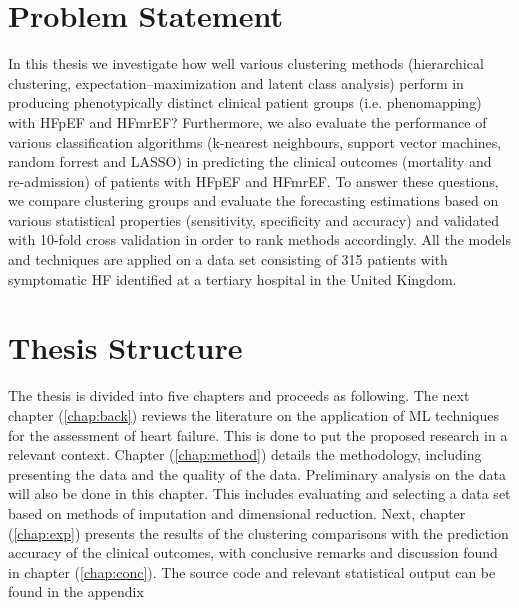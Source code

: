 \documentclass[../thesis.tex]{subfiles}
\begin{document}
\section{Problem Statement}
\label{sec:prob_stat}

\noindent In this thesis we investigate how well various clustering methods (hierarchical clustering, expectation–maximization and latent class analysis) perform in producing phenotypically distinct clinical patient groups (i.e. phenomapping) with HFpEF and HFmrEF? Furthermore, we also evaluate the performance of various classification algorithms (k-nearest neighbours, support vector machines, random forrest and LASSO) in predicting the clinical outcomes (mortality and re-admission) of patients with HFpEF and HFmrEF. To answer these questions, we compare clustering groups and evaluate the forecasting estimations based on various statistical properties (sensitivity, specificity and accuracy) and validated with 10-fold cross validation in order to rank methods accordingly. All the models and techniques are applied on a data set consisting of 315 patients with symptomatic HF identified at a tertiary hospital in the United Kingdom.  

\section{Thesis Structure}
\label{sec:thesis_struc}

\noindent The thesis is divided into five chapters and proceeds as following. The next chapter (\ref{chap:back}) reviews the literature on the application of ML techniques for the assessment of heart failure. This is done to put the proposed research in a relevant context. Chapter (\ref{chap:method}) details the methodology, including presenting the data and the quality of the data. Preliminary analysis on the data will also be done in this chapter. This includes evaluating and selecting a data set based on methods of imputation and dimensional reduction. Next, chapter (\ref{chap:exp}) presents the results of the clustering comparisons with the prediction accuracy of the clinical outcomes, with conclusive remarks and discussion found in chapter (\ref{chap:conc}). The source code and relevant statistical output can be found in the appendix  
\end{document}
